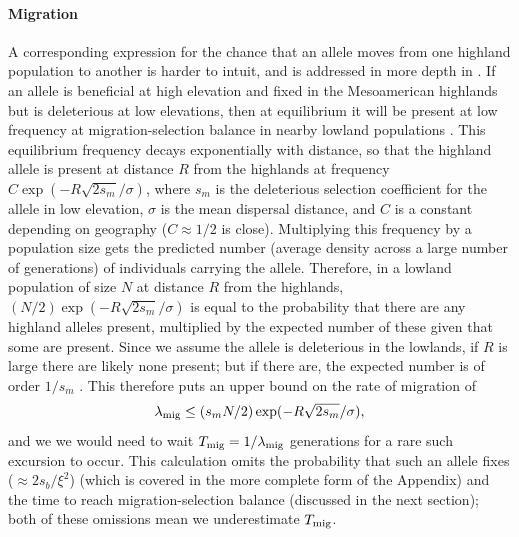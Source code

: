 \paragraph{Migration}
A corresponding expression for the chance that an allele moves from one highland population to another is harder to intuit, and is addressed in more depth in \cite{ralph2014convergent}.
If an allele is beneficial at high elevation and fixed in the Mesoamerican highlands but is deleterious at low elevations, then at equilibrium it will be present at low frequency at migration-selection balance in nearby lowland populations \citep{haldane1948theory,slatkin1973geneflow}.
This equilibrium frequency decays exponentially with distance, so that the highland allele is present at distance $R$ from the highlands at frequency $C \exp(- R \sqrt{2s_m} / \sigma)$, where $s_m$ is the deleterious selection coefficient for the allele in low elevation, $\sigma$ is the mean dispersal distance, and $C$ is a constant depending on geography ($C\approx 1/2$ is close).
Multiplying this frequency by a population size gets the predicted number (average density across a large number of generations) of individuals carrying the allele.
Therefore, in a lowland population of size $N$ at distance $R$ from the highlands, $(N/2)  \exp(- R \sqrt{2s_m} / \sigma)$ 
is equal to the probability that there are any highland alleles present, multiplied by the expected number of these given that some are present.
Since we assume the allele is deleterious in the lowlands, if $R$ is large there are likely none present;
but if there are, the expected number is of order $1/s_m$ \citep{geiger1999elementary,ralph2014convergent}.
This therefore puts an upper bound on the rate of migration of
\begin{align} \label{eqn:migrate}
  \lambda_{\text{mig}} \le (s_m N/2)  \exp(- R \sqrt{2s_m} / \sigma),
\end{align}
and we we would need to wait $T_{\text{mig}} = 1/\lambda_{\text{mig}}$ generations for a rare such excursion to occur.
This calculation omits the probability that such an allele fixes ($\approx 2s_b/\xi^2$)
(which is covered in the more complete form of the Appendix)
and the time to reach migration-selection balance
(discussed in the next section);
both of these omissions mean we underestimate $T_{\text{mig}}$.


